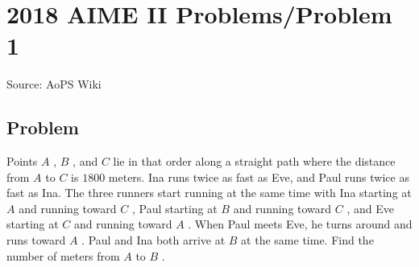 \documentclass[12pt]{article}
\begin{document}
\section*{{2018 AIME II Problems/Problem 1}}
Source: AoPS Wiki

\subsection*{Problem}
Points $A$ , $B$ , and $C$ lie in that order along a straight path where the distance from $A$ to $C$ is $1800$ meters. Ina runs twice as fast as Eve, and Paul runs twice as fast as Ina. The three runners start running at the same time with Ina starting at $A$ and running toward $C$ , Paul starting at $B$ and running toward $C$ , and Eve starting at $C$ and running toward $A$ . When Paul meets Eve, he turns around and runs toward $A$ . Paul and Ina both arrive at $B$ at the same time. Find the number of meters from $A$ to $B$ .
\end{document}
